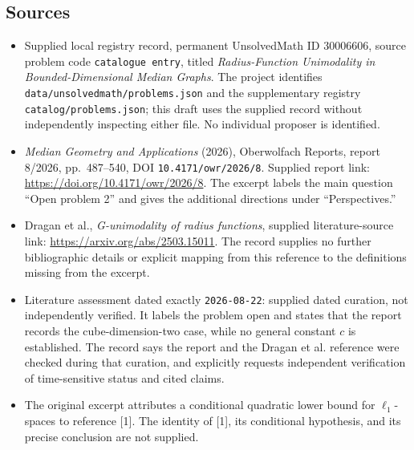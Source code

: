 \documentclass[11pt]{article}
\begin{document}
\subsection{Sources}
\begin{itemize}
\item Supplied local registry record, permanent UnsolvedMath ID \(30006606\), source problem code \texttt{catalogue entry}, titled \emph{Radius-Function Unimodality in Bounded-Dimensional Median Graphs}. The project identifies \texttt{data/unsolvedmath/problems.json} and the supplementary registry \texttt{catalog/problems.json}; this draft uses the supplied record without independently inspecting either file. No individual proposer is identified.
\item \emph{Median Geometry and Applications} (2026), Oberwolfach Reports, report 8/2026, pp.\ 487--540, DOI \texttt{10.4171/owr/2026/8}. Supplied report link: \url{https://doi.org/10.4171/owr/2026/8}. The excerpt labels the main question ``Open problem 2'' and gives the additional directions under ``Perspectives.''
\item Dragan et al., \emph{G-unimodality of radius functions}, supplied literature-source link: \url{https://arxiv.org/abs/2503.15011}. The record supplies no further bibliographic details or explicit mapping from this reference to the definitions missing from the excerpt.
\item Literature assessment dated exactly \texttt{2026-08-22}: supplied dated curation, not independently verified. It labels the problem open and states that the report records the cube-dimension-two case, while no general constant \(c\) is established. The record says the report and the Dragan et al. reference were checked during that curation, and explicitly requests independent verification of time-sensitive status and cited claims.
\item The original excerpt attributes a conditional quadratic lower bound for \(\ell_1\)-spaces to reference [1]. The identity of [1], its conditional hypothesis, and its precise conclusion are not supplied.
\end{itemize}
\end{document}
